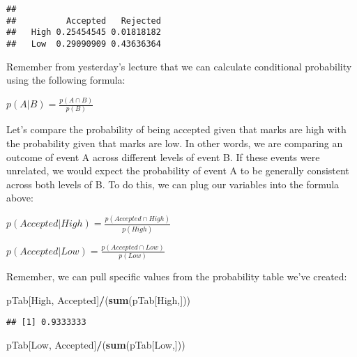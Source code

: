 \documentclass[
]{article}
\newenvironment{Shaded}{\begin{snugshade}}{\end{snugshade}}
\newcommand{\FunctionTok}[1]{\textcolor[rgb]{0.13,0.29,0.53}{\textbf{#1}}}
\newcommand{\NormalTok}[1]{#1}
\newcommand{\SpecialCharTok}[1]{\textcolor[rgb]{0.81,0.36,0.00}{\textbf{#1}}}
\newcommand{\StringTok}[1]{\textcolor[rgb]{0.31,0.60,0.02}{#1}}
\begin{document}
\begin{verbatim}
##       
##          Accepted   Rejected
##   High 0.25454545 0.01818182
##   Low  0.29090909 0.43636364
\end{verbatim}

Remember from yesterday's lecture that we can calculate conditional
probability using the following formula:

\begin{center}

$p(A|B) = \frac{p(A\cap B)}{p(B)}$

\end{center}

Let's compare the probability of being accepted given that marks are
high with the probability given that marks are low. In other words, we
are comparing an outcome of event A across different levels of event B.
If these events were unrelated, we would expect the probability of event
A to be generally consistent across both levels of B. To do this, we can
plug our variables into the formula above:

\(p(Accepted|High) = \frac{p(Accepted\cap High)}{p(High)}\)

\(p(Accepted|Low) = \frac{p(Accepted\cap Low)}{p(Low)}\)

Remember, we can pull specific values from the probability table we've
created:

\begin{Shaded}
\begin{Highlighting}[]
\NormalTok{pTab[}\StringTok{\textquotesingle{}High\textquotesingle{}}\NormalTok{, }\StringTok{\textquotesingle{}Accepted\textquotesingle{}}\NormalTok{]}\SpecialCharTok{/}\NormalTok{(}\FunctionTok{sum}\NormalTok{(pTab[}\StringTok{\textquotesingle{}High\textquotesingle{}}\NormalTok{,]))}
\end{Highlighting}
\end{Shaded}

\begin{verbatim}
## [1] 0.9333333
\end{verbatim}

\begin{Shaded}
\begin{Highlighting}[]
\NormalTok{pTab[}\StringTok{\textquotesingle{}Low\textquotesingle{}}\NormalTok{, }\StringTok{\textquotesingle{}Accepted\textquotesingle{}}\NormalTok{]}\SpecialCharTok{/}\NormalTok{(}\FunctionTok{sum}\NormalTok{(pTab[}\StringTok{\textquotesingle{}Low\textquotesingle{}}\NormalTok{,]))}
\end{Highlighting}
\end{Shaded}
\end{document}
